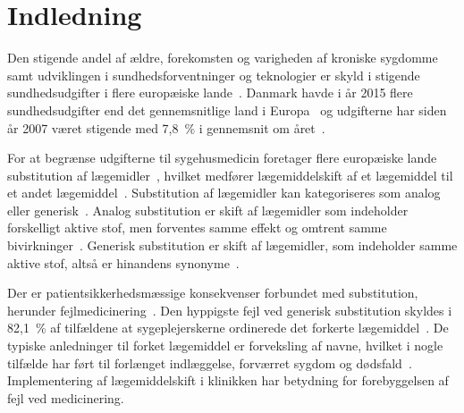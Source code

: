 \chapter{Indledning}
Den stigende andel af ældre, forekomsten og varigheden af kroniske sygdomme samt udviklingen i sundhedsforventninger og teknologier er skyld i stigende sundhedsudgifter i flere europæiske lande~\citep{Ess2003}. Danmark havde i år 2015 flere sundhedsudgifter end det gennemsnitlige land i Europa~\citep{EU2017} og udgifterne har siden år 2007 været stigende med 7,8~\% i gennemsnit om året~\citep{Sundhed2016}.

For at begrænse udgifterne til sygehusmedicin foretager flere europæiske lande substitution af lægemidler~\citep{Ess2003,Johnston2011}, hvilket medfører lægemiddelskift af et lægemiddel til et andet lægemiddel~\citep{DanskSelskabforPatientsikkerhed2009, Kairi2017}. %
Substitution af lægemidler kan kategoriseres som analog eller generisk~\citep{DanskSelskabforPatientsikkerhed2009}.  
Analog substitution er skift af lægemidler som indeholder forskelligt aktive stof, men forventes samme effekt og omtrent samme bivirkninger~\citep{DanskSelskabforPatientsikkerhed2009,Kairi2017}. 
Generisk substitution er skift af lægemidler, som indeholder samme aktive stof, altså er hinandens synonyme~\citep{DanskSelskabforPatientsikkerhed2009,Kairi2017}. 

Der er patientsikkerhedsmæssige konsekvenser forbundet med substitution, herunder fejlmedicinering~\citep{Hakonsen2010}. Den hyppigste fejl ved generisk substitution skyldes i 82,1~\% af tilfældene at sygeplejerskerne ordinerede det forkerte lægemiddel~\citep{Hakonsen2010}. De typiske anledninger til forket lægemiddel er forveksling af navne, hvilket i nogle tilfælde har ført til forlænget indlæggelse, forværret sygdom og dødsfald~\citep{DanskSelskabforPatientsikkerhed2009}. Implementering af lægemiddelskift i klinikken har betydning for forebyggelsen af fejl ved medicinering.

